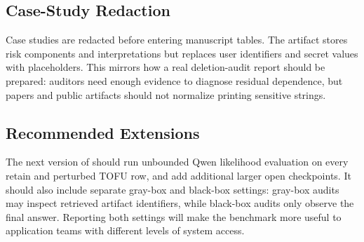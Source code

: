 

















\subsection{Case-Study Redaction}

Case studies are redacted before entering manuscript tables. The artifact stores risk components and interpretations but replaces user identifiers and secret values with placeholders. This mirrors how a real deletion-audit report should be prepared: auditors need enough evidence to diagnose residual dependence, but papers and public artifacts should not normalize printing sensitive strings.

\subsection{Recommended Extensions}

The next version of \bench{} should run unbounded Qwen likelihood evaluation on every retain and perturbed TOFU row, and add additional larger open checkpoints. It should also include separate gray-box and black-box settings: gray-box audits may inspect retrieved artifact identifiers, while black-box audits only observe the final answer. Reporting both settings will make the benchmark more useful to application teams with different levels of system access.

